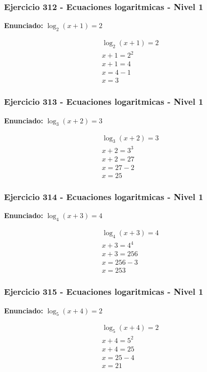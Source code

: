\documentclass[12pt,a4paper]{article}
\begin{document}
\subsubsection*{Ejercicio 312 - Ecuaciones logaritmicas - Nivel 1}
\textbf{Enunciado:} \(\log_{2}\left(x+1\right)=2\)

\[
\begin{aligned}
\log_{2}\left(x+1\right)=2\\
x+1=2^{2}\\
x+1=4\\
x=4-1\\
\boxed{x=3}
\end{aligned}
\]


\subsubsection*{Ejercicio 313 - Ecuaciones logaritmicas - Nivel 1}
\textbf{Enunciado:} \(\log_{3}\left(x+2\right)=3\)

\[
\begin{aligned}
\log_{3}\left(x+2\right)=3\\
x+2=3^{3}\\
x+2=27\\
x=27-2\\
\boxed{x=25}
\end{aligned}
\]


\subsubsection*{Ejercicio 314 - Ecuaciones logaritmicas - Nivel 1}
\textbf{Enunciado:} \(\log_{4}\left(x+3\right)=4\)

\[
\begin{aligned}
\log_{4}\left(x+3\right)=4\\
x+3=4^{4}\\
x+3=256\\
x=256-3\\
\boxed{x=253}
\end{aligned}
\]


\subsubsection*{Ejercicio 315 - Ecuaciones logaritmicas - Nivel 1}
\textbf{Enunciado:} \(\log_{5}\left(x+4\right)=2\)

\[
\begin{aligned}
\log_{5}\left(x+4\right)=2\\
x+4=5^{2}\\
x+4=25\\
x=25-4\\
\boxed{x=21}
\end{aligned}
\]
\end{document}
